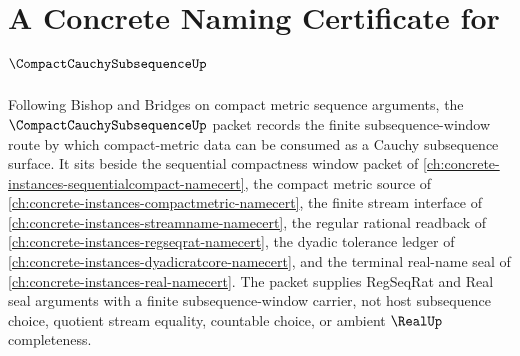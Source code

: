 \chapter{A Concrete Naming Certificate for $\CompactCauchySubsequenceUp$}
\label{ch:concrete-instances-compact-cauchy-subsequence-namecert}

Following Bishop and Bridges on compact metric sequence arguments, the $\CompactCauchySubsequenceUp$ packet records the finite subsequence-window route by which compact-metric data can be consumed as a Cauchy subsequence surface. It sits beside the sequential compactness window packet of \autoref{ch:concrete-instances-sequentialcompact-namecert}, the compact metric source of \autoref{ch:concrete-instances-compactmetric-namecert}, the finite stream interface of \autoref{ch:concrete-instances-streamname-namecert}, the regular rational readback of \autoref{ch:concrete-instances-regseqrat-namecert}, the dyadic tolerance ledger of \autoref{ch:concrete-instances-dyadicratcore-namecert}, and the terminal real-name seal of \autoref{ch:concrete-instances-real-namecert}. The packet supplies RegSeqRat and Real seal arguments with a finite subsequence-window carrier, not host subsequence choice, quotient stream equality, countable choice, or ambient $\RealUp$ completeness.

